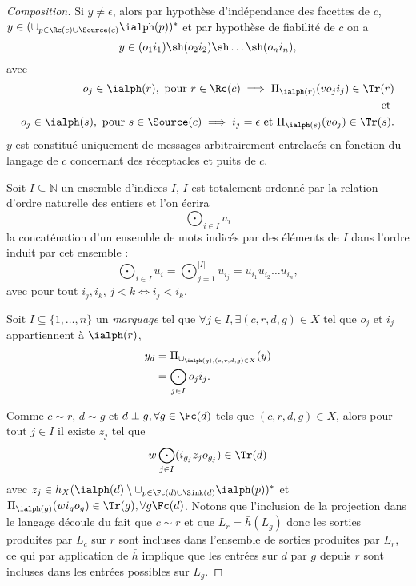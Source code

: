 \begin{proof}[Composition]
    Si $y\neq\epsilon$, alors par hypoth\`ese d'ind\'ependance des
    facettes de $c$, $y\in (\cup_{p\in\Rc(c)\cup
      \Source(c)}\ialph(p))^*$ et par hypoth\`ese de fiabilit\'e de
    $c$ on a
    $$
    y \in (o_1 i_1) \sh (o_2 i_2) \sh \dots \sh (o_n i_n),
    $$ 
    avec 
    \begin{eqnarray}
        o_j \in \ialph(r), \mbox{~pour~} r\in \Rc(c) \implies
        \Pi_{\ialph(r)} (v o_j i_j) \in \Tr(r) \label{eq:c-fiab-rec-ncnx}\\
        \mbox{~et~} \notag\\
        o_j \in \ialph(s), \mbox{~pour~} s\in \Source(c) \implies
        i_j = \epsilon \mbox{~et~} \Pi_{\ialph(s)} (v o_j ) \in
        \Tr(s).\label{eq:c-fiab-puits}
\end{eqnarray}
$y$ est constitu\'e uniquement de messages arbitrairement
    entrelac\'es en fonction du langage de $c$ concernant des
    r\'eceptacles et puits de $c$. 

Soit $I\subseteq \mathbb{N}$ un ensemble d'indices $I$, $I$ est
totalement ordonn\'e par la relation d'ordre naturelle des entiers et
l'on \'ecrira 
$$
\bigodot_{i\in I} u_i
$$
la concat\'enation d'un ensemble de mots indic\'es par des
\'el\'ements de $I$ dans l'ordre induit par cet ensemble : 
$$
\bigodot_{i\in I} u_i = \bigodot_{j=1}^{\vert I\vert} u_{i_j} = u_{i_1} u_{i_2} \dots u_{i_n},  
$$
avec pour tout $i_j,i_k$, $j<k \Leftrightarrow i_j < i_k$.


    Soit $I\subseteq \{1,\dots,n\}$ un \emph{marquage} tel que $\forall j \in I, \exists
    (c,r,d,g)\in X$ tel que $o_j$ et 
    $i_j$ appartiennent \`a $\ialph(r)$, 
    \begin{align*}
        y_d&=\Pi_{\cup_{\ialph(g), (c,r,d,g)\in X}}(y)\\
        &=\bigodot_{j\in I} o_j i_j.
    \end{align*}
    
    Comme $c \sim r$, $d\sim g$ et $d \perp g, \forall g \in \Fc(d)$
    tels que $(c,r,d,g)\in X$, alors pour tout $j\in I$ il existe $z_j$ tel que 
    $$
    w \bigodot_{j\in I} (i_{g_j} z_j o_{g_j}) \in \Tr(d)
    $$ 
    avec $z_j \in h_X(\ialph(d)\setminus \cup_{p\in \Fc(d)\cup
    \Sink(d)}\ialph(p))^*$ et $\Pi_{\ialph(g)}(w i_g o_g) \in \Tr(g),
    \forall g \Fc(d)$. Notons que l'inclusion de la projection dans le
    langage d\'ecoule du fait que $c\sim r$ et que $L_r=
    \bar{h}(L_g)$ donc les sorties produites par $L_c$ sur $r$ sont
    incluses dans l'ensemble de sorties produites par $L_r$, ce qui
    par application de $\bar{h}$ implique que les entr\'ees sur $d$
    par $g$  depuis $r$  sont incluses dans les entr\'ees possibles sur
    $L_g$.
    

\end{proof}
